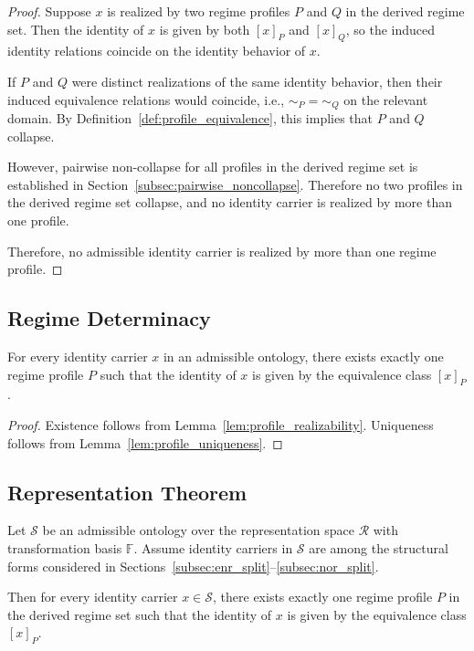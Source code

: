 \begin{proof}
Suppose $x$ is realized by two regime profiles $P$ and $Q$
in the derived regime set.
Then the identity of $x$ is given by both $[x]_P$ and $[x]_Q$,
so the induced identity relations coincide on the identity behavior of $x$.

If $P$ and $Q$ were distinct realizations of the same identity behavior,
then their induced equivalence relations would coincide,
i.e., $\sim_P = \sim_Q$ on the relevant domain.
By Definition~\ref{def:profile_equivalence}, this implies that $P$ and $Q$ collapse.

However, pairwise non-collapse for all profiles in the derived regime set
is established in Section~\ref{subsec:pairwise_noncollapse}.
Therefore no two profiles in the derived regime set collapse,
and no identity carrier is realized by more than one profile.

Therefore, no admissible identity carrier is realized by more than one regime profile.
\end{proof}

\subsection{Regime Determinacy}
\label{subsec:determinacy}

\begin{lemma}
\label{lem:regime_determinacy}
For every identity carrier $x$ in an admissible ontology,
there exists exactly one regime profile $P$
such that the identity of $x$ is given by the equivalence class $[x]_P$.
\end{lemma}

\begin{proof}
Existence follows from Lemma~\ref{lem:profile_realizability}.
Uniqueness follows from Lemma~\ref{lem:profile_uniqueness}.
\end{proof}

\subsection{Representation Theorem}
\label{subsec:representation_theorem}

\begin{theorem}
\label{thm:representation}
Let $\mathcal{S}$ be an admissible ontology over the
representation space $\mathcal{R}$
with transformation basis $\mathbb{F}$.
Assume identity carriers in $\mathcal{S}$ are
among the structural forms
considered in Sections~\ref{subsec:enr_split}--\ref{subsec:nor_split}.

Then for every identity carrier $x \in \mathcal{S}$,
there exists exactly one regime profile $P$ in the derived regime set
such that the identity of $x$ is given by the equivalence class $[x]_P$.
\end{theorem}

